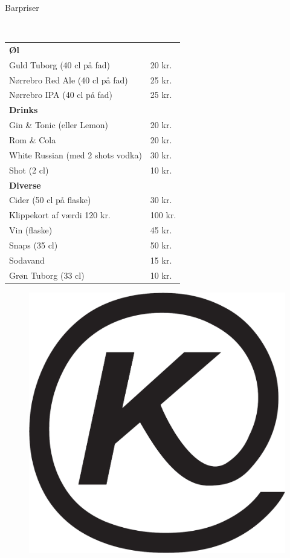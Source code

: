 \begin{flushleft}
\begin{huge}
Barpriser
\end{huge}
\\[.1cm]
\begin{table}[h!]
\begin{tabular}{p{} p{}}
\textbf{Øl} & \\
Guld Tuborg (40 cl på fad) & 20 kr.\\
Nørrebro Red Ale (40 cl på fad) & 25 kr.\\
Nørrebro IPA (40 cl på fad) & 25 kr.\\[2ex]
\textbf{Drinks} & \\
Gin \& Tonic (eller Lemon) & 20 kr.\\
Rom \& Cola & 20 kr.\\
White Russian \scriptsize{(med 2 shots vodka)} & 30 kr.\\
Shot (2 cl) & 10 kr.\\[2ex]
\textbf{Diverse} & \\
Cider (50 cl på flaske) & 30 kr. \\
Klippekort af værdi 120 kr. & 100 kr.\\
Vin (flaske) & 45 kr.\\
Snaps (35 cl) & 50 kr.\\
Sodavand & 15 kr.\\
Grøn Tuborg (33 cl) & 10 kr.\\
\end{tabular}
\end{table}
\end{flushleft}
\begin{figure}[h!]
    \begin{center}
    \includegraphics[width=.45\linewidth]{../logo.pdf}
\end{center}
\end{figure}
